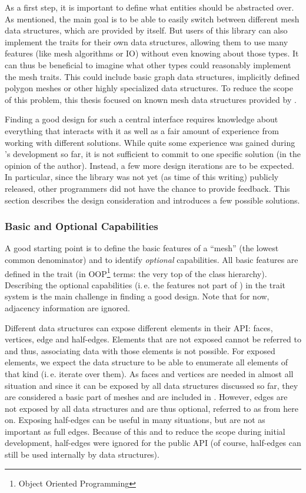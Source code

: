 As a first step, it is important to define what entities should be abstracted over.
As mentioned, the main goal is to be able to easily switch between different mesh data structures, which are provided by  itself.
But users of this library can also implement the traits for their own data structures, allowing them to use many features (like mesh algorithms or IO) without  even knowing about those types.
It can thus be beneficial to imagine what other types could reasonably implement the mesh traits.
This could include basic graph data structures, implicitly defined polygon meshes or other highly specialized data structures.
To reduce the scope of this problem, this thesis focused on known mesh data structures provided by .

Finding a good design for such a central interface requires knowledge about everything that interacts with it as well as a fair amount of experience from working with different solutions.
While quite some experience was gained during 's development so far, it is not sufficient to commit to one specific solution (in the opinion of the author).
Instead, a few more design iterations are to be expected.
In particular, since the library was not yet (as time of this writing) publicly released, other programmers did not have the chance to provide feedback.
This section describes the design consideration and introduces a few possible solutions.


\subsubsection*{Basic and Optional Capabilities}

A good starting point is to define the basic features of a \enquote{mesh} (the lowest common denominator) and to identify \emph{optional} capabilities.
All basic features are defined in the trait  (in OOP\footnote{Object Oriented Programming} terms: the very top of the class hierarchy).
Describing the optional capabilities (i.\,e. the features not part of ) in the trait system is the main challenge in finding a good design.
Note that for now, adjacency information are ignored.

Different data structures can expose different elements in their API: faces, vertices, edge and half-edges.
Elements that are not exposed cannot be referred to and thus, associating data with those elements is not possible.
For exposed elements, we expect the data structure to be able to enumerate all elements of that kind (i.\,e. iterate over them).
As faces and vertices are needed in almost all situation and since it can be exposed by all data structures discussed so far, they are considered a basic part of meshes and are included in .
However, edges are not exposed by all data structures and are thus optional, referred to as  from here on.
Exposing half-edges can be useful in many situations, but are not as important as full edges.
Because of this and to reduce the scope during initial development, half-edges were ignored for the public API (of course, half-edges can still be used internally by data structures).

